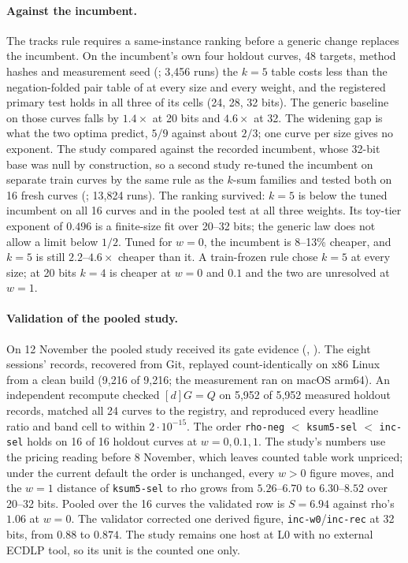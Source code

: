 \paragraph{Against the incumbent.} The tracks rule requires a same-instance
ranking before a generic change replaces the incumbent. On the incumbent's
own four holdout curves, 48 targets, method hashes and measurement seed
(; 3{,}456 runs) the $k=5$
table costs less than the negation-folded pair table of
 at every size and every
weight, and the registered primary test holds in all three of its cells
(24, 28, 32 bits). The generic baseline on those curves falls by $1.4\times$
at 20 bits and $4.6\times$ at 32. The widening gap is what the two optima
predict, $5/9$ against about $2/3$; one curve per size gives no exponent.
The study compared against the recorded incumbent, whose 32-bit base was
null by construction, so a second study re-tuned the incumbent on separate
train curves by the same rule as the $k$-sum families and tested both on 16
fresh curves (; 13{,}824 runs).
The ranking survived: $k=5$ is below the tuned incumbent on all 16 curves
and in the pooled test at all three weights. Its toy-tier exponent of
$0.496$ is a finite-size fit over 20--32 bits; the generic law does not
allow a limit below $1/2$. Tuned for $w=0$, the incumbent
is 8--13\% cheaper, and $k=5$ is still $2.2$--$4.6\times$ cheaper than it. A train-frozen
rule chose $k=5$ at every size; at 20 bits $k=4$ is cheaper at $w=0$ and
$0.1$ and the two are unresolved at $w=1$.

\paragraph{Validation of the pooled study.} On 12 November the pooled
study received its gate evidence
(,
). The eight
sessions' records, recovered from Git, replayed count-identically on x86
Linux from a clean build (9{,}216 of 9{,}216; the measurement ran on macOS
arm64). An independent recompute checked $[d]G=Q$ on 5{,}952 of 5{,}952
measured holdout records, matched all 24 curves to the registry, and
reproduced every headline ratio and band cell to within $2\cdot10^{-15}$.
The order \texttt{rho-neg} $<$ \texttt{ksum5-sel} $<$ \texttt{inc-sel}
holds on 16 of 16 holdout curves at $w=0,0.1,1$. The study's numbers use the
pricing reading before 8 November, which leaves counted table work
unpriced; under the current default the order is unchanged, every $w>0$
figure moves, and the $w=1$ distance of \texttt{ksum5-sel} to rho grows
from $5.26$--$6.70$ to $6.30$--$8.52$ over 20--32 bits. Pooled over the 16
curves the validated row is $S=6.94$ against rho's $1.06$ at $w=0$. The
validator corrected one derived figure, \texttt{inc-w0}/\texttt{inc-rec}
at 32 bits, from $0.88$ to $0.874$. The study remains one host at L0 with
no external ECDLP tool, so its unit is the counted one only.

